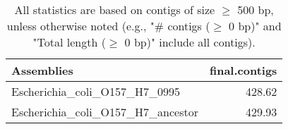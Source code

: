 \documentclass[12pt,a4paper]{article}
\begin{document}
\begin{table}[ht]
\begin{center}
\caption{All statistics are based on contigs of size $\geq$ 500 bp, unless otherwise noted (e.g., "\# contigs ($\geq$ 0 bp)" and "Total length ($\geq$ 0 bp)" include all contigs).}
\begin{tabular}{|l*{1}{|r}|}
\hline
Assemblies & final.contigs \\ \hline
Escherichia\_coli\_O157\_H7\_0995 & 428.62 \\ \hline
Escherichia\_coli\_O157\_H7\_ancestor & 429.93 \\ \hline
\end{tabular}
\end{center}
\end{table}
\end{document}

